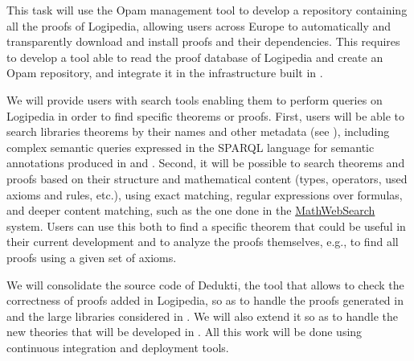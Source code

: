 \begin{workpackage}[id=access,type=RTD,wphases=1-48,
  short=Access,%
  title={Access},
  lead=Inr,InrRM=48,OcaRM=6,EduRM=12]
\begin{tasklist}
\begin{task}[id=opam,
      title=Giving access to the infrastructure in proof systems,
      lead=Oca,OcaRM=6,wphases=15-24]
    This task will use the Opam management tool to develop a
    repository containing all the proofs of Logipedia, allowing users
    across Europe to automatically and transparently download and
    install proofs and their dependencies. This
    requires to develop a tool able to read the proof
    database of Logipedia and create an Opam repository,
    and integrate it in the infrastructure built in .
  \end{task}

  \begin{task}[id=search,
      title=Providing search tools,
      lead=Inr,InrRM=18,wphases=15-33]
    We will provide users with search tools enabling them to perform
    queries on Logipedia in order to find specific theorems or proofs.
    First, users will be able to search libraries theorems by their
    names and other metadata (see ),
    including complex semantic queries expressed in the SPARQL
    language for semantic annotations produced in
     and
    . Second, it will be possible to
    search theorems and proofs based on their structure and
    mathematical content (types, operators, used axioms and rules,
    etc.), using exact matching, regular expressions over formulas, and
    deeper content matching, such as the one done in the
    \hyperlink{https://kwarc.info/systems/mws/}{MathWebSearch}
    system. Users can use this both to find a specific theorem that
    could be useful in their current development and to analyze the
    proofs themselves, e.g., to find all proofs using a given set of
    axioms. 
  \end{task}

  \begin{task}[id=dedukti,
      title=Development of Dedukti checking and translation tools,
      lead=Inr,InrRM=24,wphases=13-36]
    We will consolidate the source code of Dedukti, the tool that allows
    to check the correctness of proofs added in Logipedia, so as to
    handle the proofs generated in  and the
    large libraries considered in . We will also
    extend it so as to handle the new theories that will be developed
    in .
    All this work will be done using continuous integration and
    deployment tools.
  \end{task}
  

\end{tasklist}
\end{workpackage}
